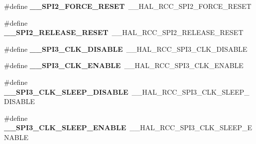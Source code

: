 \begin{DoxyCompactItemize}
\item 
\hypertarget{group___h_a_l___r_c_c___aliased_gae187d618acdf2464672bf0b18c34e5cd}{\#define {\bfseries \-\_\-\-\_\-\-S\-P\-I2\-\_\-\-F\-O\-R\-C\-E\-\_\-\-R\-E\-S\-E\-T}~\-\_\-\-\_\-\-H\-A\-L\-\_\-\-R\-C\-C\-\_\-\-S\-P\-I2\-\_\-\-F\-O\-R\-C\-E\-\_\-\-R\-E\-S\-E\-T}\label{group___h_a_l___r_c_c___aliased_gae187d618acdf2464672bf0b18c34e5cd}

\item 
\hypertarget{group___h_a_l___r_c_c___aliased_ga92a086f3ba8dd0d3afe55ba477704051}{\#define {\bfseries \-\_\-\-\_\-\-S\-P\-I2\-\_\-\-R\-E\-L\-E\-A\-S\-E\-\_\-\-R\-E\-S\-E\-T}~\-\_\-\-\_\-\-H\-A\-L\-\_\-\-R\-C\-C\-\_\-\-S\-P\-I2\-\_\-\-R\-E\-L\-E\-A\-S\-E\-\_\-\-R\-E\-S\-E\-T}\label{group___h_a_l___r_c_c___aliased_ga92a086f3ba8dd0d3afe55ba477704051}

\item 
\hypertarget{group___h_a_l___r_c_c___aliased_ga28cdbd67b8d023f6c6d779ad764be780}{\#define {\bfseries \-\_\-\-\_\-\-S\-P\-I3\-\_\-\-C\-L\-K\-\_\-\-D\-I\-S\-A\-B\-L\-E}~\-\_\-\-\_\-\-H\-A\-L\-\_\-\-R\-C\-C\-\_\-\-S\-P\-I3\-\_\-\-C\-L\-K\-\_\-\-D\-I\-S\-A\-B\-L\-E}\label{group___h_a_l___r_c_c___aliased_ga28cdbd67b8d023f6c6d779ad764be780}

\item 
\hypertarget{group___h_a_l___r_c_c___aliased_gaa92d4898892ab4c0fba44fa0b6ac02b4}{\#define {\bfseries \-\_\-\-\_\-\-S\-P\-I3\-\_\-\-C\-L\-K\-\_\-\-E\-N\-A\-B\-L\-E}~\-\_\-\-\_\-\-H\-A\-L\-\_\-\-R\-C\-C\-\_\-\-S\-P\-I3\-\_\-\-C\-L\-K\-\_\-\-E\-N\-A\-B\-L\-E}\label{group___h_a_l___r_c_c___aliased_gaa92d4898892ab4c0fba44fa0b6ac02b4}

\item 
\hypertarget{group___h_a_l___r_c_c___aliased_ga7d9b001be65e2b904269e60f476643eb}{\#define {\bfseries \-\_\-\-\_\-\-S\-P\-I3\-\_\-\-C\-L\-K\-\_\-\-S\-L\-E\-E\-P\-\_\-\-D\-I\-S\-A\-B\-L\-E}~\-\_\-\-\_\-\-H\-A\-L\-\_\-\-R\-C\-C\-\_\-\-S\-P\-I3\-\_\-\-C\-L\-K\-\_\-\-S\-L\-E\-E\-P\-\_\-\-D\-I\-S\-A\-B\-L\-E}\label{group___h_a_l___r_c_c___aliased_ga7d9b001be65e2b904269e60f476643eb}

\item 
\hypertarget{group___h_a_l___r_c_c___aliased_gaef9852457424d2e92e6e1cb1366b8981}{\#define {\bfseries \-\_\-\-\_\-\-S\-P\-I3\-\_\-\-C\-L\-K\-\_\-\-S\-L\-E\-E\-P\-\_\-\-E\-N\-A\-B\-L\-E}~\-\_\-\-\_\-\-H\-A\-L\-\_\-\-R\-C\-C\-\_\-\-S\-P\-I3\-\_\-\-C\-L\-K\-\_\-\-S\-L\-E\-E\-P\-\_\-\-E\-N\-A\-B\-L\-E}\label{group___h_a_l___r_c_c___aliased_gaef9852457424d2e92e6e1cb1366b8981}


\end{DoxyCompactItemize}

